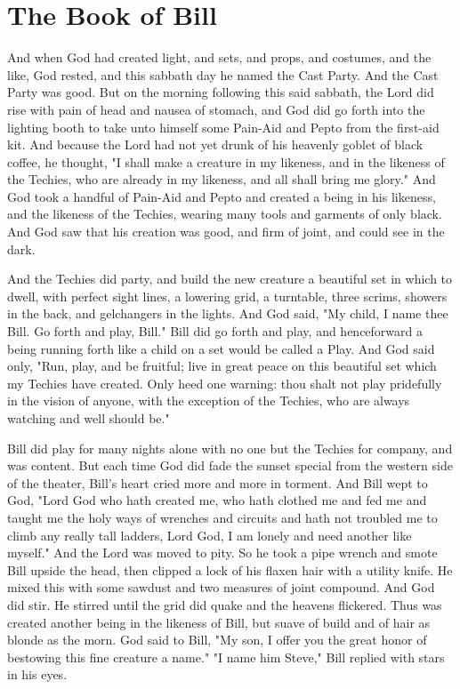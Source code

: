 \documentclass[10pt,a4paper,oneside]{article}
\begin{document}
\section{The Book of Bill}
And when God had created light, and sets, and props, and costumes, and the like, God rested, and this sabbath day he named the Cast Party. And the Cast Party was good. But on the morning following this said sabbath, the Lord did rise with pain of head and nausea of stomach, and God did go forth into the lighting booth to take unto himself some Pain-Aid and Pepto from the first-aid kit. And because the Lord had not yet drunk of his heavenly goblet of black coffee, he thought, "I shall make a creature in my likeness, and in the likeness of the Techies, who are already in my likeness, and all shall bring me glory." And God took a handful of Pain-Aid and Pepto and created a being in his likeness, and the likeness of the Techies, wearing many tools and garments of only black. And God saw that his creation was good, and firm of joint, and could see in the dark. 

And the Techies did party, and build the new creature a beautiful set in which to dwell, with perfect sight lines, a lowering grid, a turntable, three scrims, showers in the back, and gelchangers in the lights. And God said, "My child, I name thee Bill. Go forth and play, Bill." Bill did go forth and play, and henceforward a being running forth like a child on a set would be called a Play. And God said only, "Run, play, and be fruitful; live in great peace on this beautiful set which my Techies have created. Only heed one warning: thou shalt not play pridefully in the vision of anyone, with the exception of the Techies, who are always watching and well should be."

Bill did play for many nights alone with no one but the Techies for company, and was content. But each time God did fade the sunset special from the western side of the theater, Bill's heart cried more and more in torment. And Bill wept to God, "Lord God who hath created me, who hath clothed me and fed me and taught me the holy ways of wrenches and circuits and hath not troubled me to climb any really tall ladders, Lord God, I am lonely and need another like myself." And the Lord was moved to pity. So he took a pipe wrench and smote Bill upside the head, then clipped a lock of his flaxen hair with a utility knife. He mixed this with some sawdust and two measures of joint compound. And God did stir. He stirred until the grid did quake and the heavens flickered. Thus was created another being in the likeness of Bill, but suave of build and of hair as blonde as the morn. God said to Bill, "My son, I offer you the great honor of bestowing this fine creature a name." "I name him Steve," Bill replied with stars in his eyes.
\end{document}
